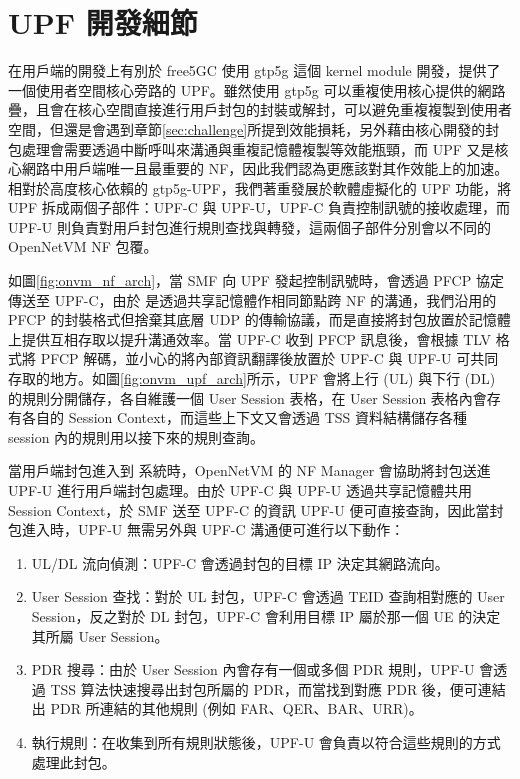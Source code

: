 \section{UPF 開發細節}
\label{sec:upf_porting}

在用戶端的開發上有別於 free5GC 使用 gtp5g 這個 kernel module 開發，\LHCN 提供了一個使用者空間核心旁路的 UPF。雖然使用 gtp5g 可以重複使用核心提供的網路疊，且會在核心空間直接進行用戶封包的封裝或解封，可以避免重複複製到使用者空間，但還是會遇到章節\ref{sec:challenge}所提到效能損耗，另外藉由核心開發的封包處理會需要透過中斷呼叫來溝通\cite{interrupt_process}與重複記憶體複製等效能瓶頸，而 UPF 又是核心網路中用戶端唯一且最重要的 NF，因此我們認為更應該對其作效能上的加速。相對於高度核心依賴的 gtp5g-UPF，我們著重發展於軟體虛擬化的 UPF 功能，將 UPF 拆成兩個子部件：UPF-C 與 UPF-U，UPF-C 負責控制訊號的接收處理，而 UPF-U 則負責對用戶封包進行規則查找與轉發，這兩個子部件分別會以不同的 OpenNetVM NF 包覆。

如圖\ref{fig:onvm_nf_arch}，當 SMF 向 UPF 發起控制訊號時，會透過 PFCP 協定傳送至 UPF-C，由於 \LHCN 是透過共享記憶體作相同節點跨 NF 的溝通，我們沿用的 PFCP 的封裝格式但捨棄其底層 UDP 的傳輸協議，而是直接將封包放置於記憶體上提供互相存取以提升溝通效率。當 UPF-C 收到 PFCP 訊息後，會根據 TLV 格式將 PFCP 解碼，並小心的將內部資訊翻譯後放置於 UPF-C 與 UPF-U 可共同存取的地方。如圖\ref{fig:onvm_upf_arch}所示，UPF 會將上行 (UL) 與下行 (DL) 的規則分開儲存，各自維護一個 User Session 表格，在 User Session 表格內會存有各自的 Session Context，而這些上下文又會透過 TSS 資料結構儲存各種 session 內的規則用以接下來的規則查詢。


當用戶端封包進入到 \LHCN 系統時，OpenNetVM 的 NF Manager 會協助將封包送進 UPF-U 進行用戶端封包處理。由於 UPF-C 與 UPF-U 透過共享記憶體共用 Session Context，於 SMF 送至 UPF-C 的資訊 UPF-U 便可直接查詢，因此當封包進入時，UPF-U 無需另外與 UPF-C 溝通便可進行以下動作：

\begin{enumerate}
\item UL/DL 流向偵測：UPF-C 會透過封包的目標 IP 決定其網路流向。
\item User Session 查找：對於 UL 封包，UPF-C 會透過 TEID 查詢相對應的 User Session，反之對於 DL 封包，UPF-C 會利用目標 IP 屬於那一個 UE 的決定其所屬 User Session。
\item PDR 搜尋：由於 User Session 內會存有一個或多個 PDR 規則，UPF-U 會透過 TSS 算法快速搜尋出封包所屬的 PDR，而當找到對應 PDR 後，便可連結出 PDR 所連結的其他規則 (例如 FAR、QER、BAR、URR)。
\item 執行規則：在收集到所有規則狀態後，UPF-U 會負責以符合這些規則的方式處理此封包。
\end{enumerate}

